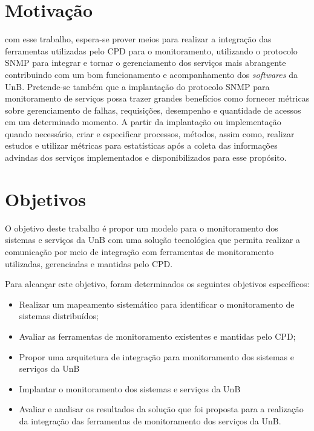 
\section{Motivação}



com esse trabalho, espera-se prover meios para realizar a integração das ferramentas utilizadas pelo \acrshort{CPD} para o monitoramento, utilizando o protocolo \acrshort{SNMP} para integrar e tornar o gerenciamento dos serviços mais abrangente contribuindo com um bom funcionamento e acompanhamento dos \textit{softwares} da \acrshort{UnB}. Pretende-se também que a implantação do protocolo \acrshort{SNMP} para monitoramento de serviços possa trazer grandes benefícios como fornecer métricas sobre gerenciamento de falhas, requisições, desempenho e quantidade de acessos em um determinado momento. A partir da implantação ou implementação quando necessário, criar e especificar processos, métodos, assim como, realizar estudos e utilizar métricas para estatísticas após a coleta das informações advindas dos serviços implementados e disponibilizados para esse propósito.



\section{Objetivos}
\label{objetivos}

O objetivo deste trabalho é propor um modelo para o monitoramento dos sistemas e serviços da \acrfull{UnB} com uma solução tecnológica que permita realizar a comunicação por meio de integração com ferramentas de monitoramento utilizadas, gerenciadas e mantidas pelo \acrfull{CPD}.

Para alcançar este objetivo, foram determinados os seguintes objetivos específicos:

\begin{itemize}
	 
\item Realizar um mapeamento sistemático para identificar o monitoramento
de sistemas distribuídos;

\item Avaliar as ferramentas de monitoramento existentes e mantidas pelo \acrshort{CPD};

\item Propor uma arquitetura de integração para monitoramento dos sistemas e serviços da \acrshort{UnB}

\item Implantar o monitoramento dos sistemas e serviços da \acrshort{UnB}

\item Avaliar e analisar os resultados da solução que foi proposta para a realização da integração das ferramentas de monitoramento dos serviços da \acrshort{UnB}. 

\end{itemize}

